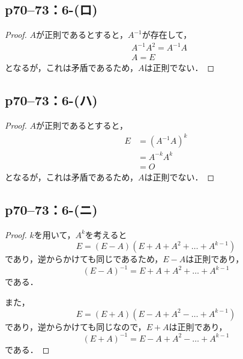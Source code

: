 \documentclass[a4paper,10pt,fleqn]{ltjsarticle}
\begin{document}
\subsection*{p70--73：6-(ロ)}


\begin{tleftbar}
  \begin{proof}
    $A$が正則であるとすると，$A^{-1}$が存在して，
    \begin{align*}
       & A^{-1} A^{2} = A^{-1} A \\
       & A = E
    \end{align*}
    となるが，これは矛盾であるため，$A$は正則でない．
  \end{proof}
\end{tleftbar}

\subsection*{p70--73：6-(ハ)}

\begin{tleftbar}
  \begin{proof}
    $A$が正則であるとすると，
    \begin{align*}
      E & = (A^{-1} A)^{k} \\
        & = A^{-k} A^{k}   \\
        & = O
    \end{align*}
    となるが，これは矛盾であるため，$A$は正則でない．
  \end{proof}
\end{tleftbar}

\subsection*{p70--73：6-(ニ)}

\begin{tleftbar}
  \begin{proof}
    $k$を用いて，$A^k$を考えると
    \[
      E = (E-A)(E+A+A^2+\dots+A^{k-1})
    \]
    であり，逆からかけても同じであるため，$E-A$は正則であり，
    \[
      (E-A)^{-1}=E+A+A^2+\dots+A^{k-1}
    \]
    である．

    また，
    \[
      E=(E+A)(E-A+A^2-\dots+A^{k-1})
    \]
    であり，逆からかけても同じなので，$E+A$は正則であり，
    \[
      (E+A)^{-1} = E-A+A^2-\dots+A^{k-1}
    \]
    である．
  \end{proof}
\end{tleftbar}
\end{document}
